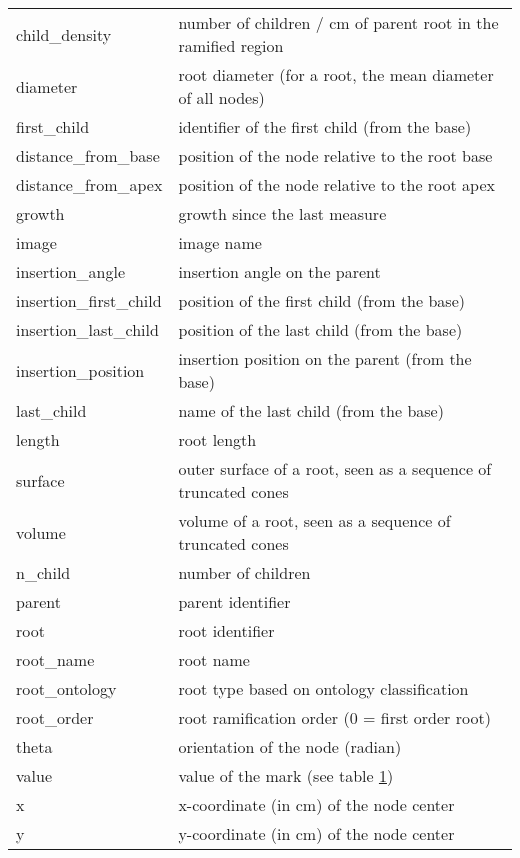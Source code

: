 \documentclass[a4paper,english,10pt]{report}
\begin{document}
\begin{table}[!htdp]
\begin{center}
\begin{tabular}{|lp{10cm}|}
child\_density & number of children / cm of parent root in the ramified region \\ 
diameter  & root diameter (for a root, the mean diameter of all nodes)\\ 
first\_child  & identifier of the first child (from the base)\\ 
distance\_from\_base  & position of the node relative to the root base\\
distance\_from\_apex  & position of the node relative to the root apex\\
growth & growth since the last measure\\
image & image name\\
insertion\_angle & insertion angle on the parent\\
insertion\_first\_child  & position of the first child (from the base)\\
insertion\_last\_child & position of the last child (from the base)\\
insertion\_position  & insertion position on the parent (from the base)\\
last\_child  & name of the last child (from the base)\\
length  & root length\\
surface  & outer surface of a root, seen as a sequence of truncated cones\\
volume  & volume of a root, seen as a sequence of truncated cones\\
n\_child & number of children\\ 
parent  & parent identifier\\
root  & root identifier\\
root\_name  & root name\\
root\_ontology  & root type based on ontology classification\\
root\_order  & root ramification order (0 = first order root)\\
theta  & orientation of the node (radian) \\
value  & value of the mark (see table \ref{mark_val})\\
x  & x-coordinate (in cm) of the node center \\
y  & y-coordinate (in cm) of the node center \\ \hline

\end{tabular}
\end{center}
\label{mark_val}
\end{table}%
\end{document}
